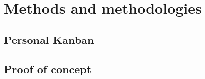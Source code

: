
\chapter{Methods and methodologies} %

\label{Chapter2} %


\section{Personal Kanban}


\section{Proof of concept}

